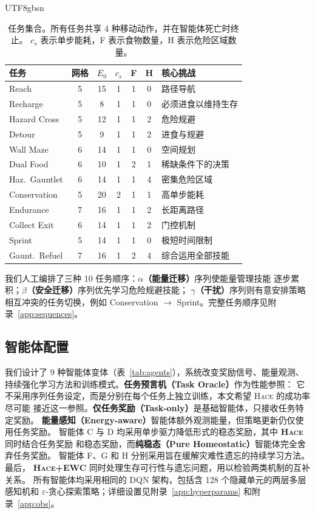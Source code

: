 \documentclass[sigplan,10pt]{acmart}
\newcommand{\energy}{E}
\newcommand{\hace}{\textsc{Hace}}
\begin{document}
\begin{CJK*}{UTF8}{gbsn}
\begin{table}[t]
\centering
\caption{任务集合。所有任务共享 4 种移动动作，并在智能体死亡时终止。
$c_s$ 表示单步能耗，F 表示食物数量，H 表示危险区域数量。}
\label{tab:tasks}
\small
\setlength{\tabcolsep}{3.8pt}
\begin{tabular}{@{}lcccccl@{}}
\toprule
\textbf{任务} & \textbf{网格} & $\energy_0$ & $c_s$ &
\textbf{F} & \textbf{H} & \textbf{核心挑战} \\
\midrule
Reach          & 5 & 15 & 1 & 1 & 0 & 路径导航 \\
Recharge       & 5 &  8 & 1 & 1 & 0 & 必须进食以维持生存 \\
Hazard Cross   & 5 & 12 & 1 & 1 & 2 & 危险规避 \\
Detour         & 5 &  9 & 1 & 1 & 2 & 进食与规避 \\
Wall Maze      & 6 & 14 & 1 & 1 & 0 & 空间规划 \\
Dual Food      & 6 & 10 & 1 & 2 & 1 & 稀缺条件下的决策 \\
Haz.~Gauntlet  & 6 & 14 & 1 & 1 & 4 & 密集危险区域 \\
Conservation   & 5 & 20 & 2 & 1 & 1 & 高单步能耗 \\
Endurance      & 7 & 16 & 1 & 1 & 2 & 长距离路径 \\
Collect Exit   & 6 & 14 & 1 & 1 & 2 & 门控机制 \\
Sprint         & 5 & 14 & 1 & 1 & 0 & 极短时间限制 \\
Gaunt.~Refuel  & 7 & 16 & 1 & 2 & 4 & 综合运用全部技能 \\
\bottomrule
\end{tabular}
\end{table}

我们人工编排了三种 10 任务顺序：\textbf{$\alpha$（能量迁移）}序列使能量管理技能
逐步累积；\textbf{$\beta$（安全迁移）}序列优先学习危险规避技能；
\textbf{$\gamma$（干扰）}序列则有意安排策略相互冲突的任务切换，例如
Conservation $\to$ Sprint。完整任务顺序见附录~\ref{app:sequences}。

\subsection{智能体配置}

我们设计了 9 种智能体变体（表~\ref{tab:agents}），系统改变奖励信号、能量观测、
持续强化学习方法和训练模式。\textbf{任务预言机（Task Oracle）}作为性能参照：
它不采用序列任务设定，而是分别在每个任务上独立训练，本文希望 \hace{} 的成功率尽可能
接近这一参照。\textbf{仅任务奖励（Task-only）}是基础智能体，只接收任务特定奖励。
\textbf{能量感知（Energy-aware）}智能体额外观测能量，但策略更新仍仅使用任务奖励。
智能体 C 与 D 均采用单步驱力降低形式的稳态奖励，其中 \textbf{\hace{}} 同时结合任务奖励
和稳态奖励，而\textbf{纯稳态（Pure Homeostatic）}智能体完全舍弃任务奖励。
智能体 F、G 和 H 分别采用旨在缓解灾难性遗忘的持续学习方法。最后，
\textbf{\hace{}+EWC} 同时处理生存可行性与遗忘问题，用以检验两类机制的互补关系。
所有智能体均采用相同的 DQN 架构，包括含 128 个隐藏单元的两层多层感知机和
$\varepsilon$-贪心探索策略；详细设置见附录~\ref{app:hyperparams}
和附录~\ref{app:obs}。


\end{CJK*}
\end{document}
